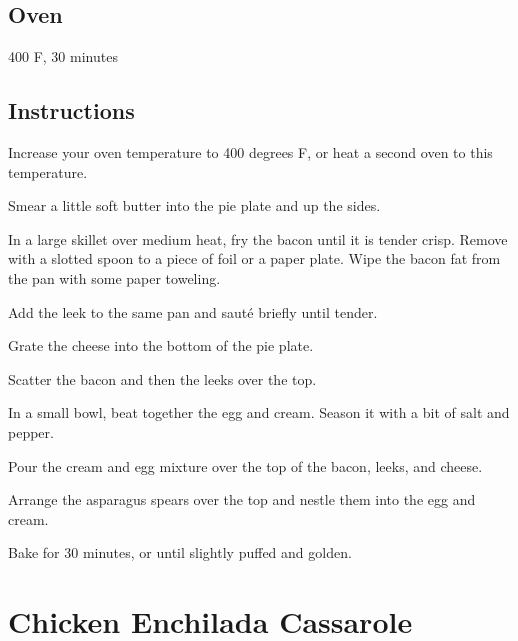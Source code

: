 \documentclass[ansiapaper,10pt,english]{sphinxmanual}
\begin{document}
\section{Oven}
\label{\detokenize{Bacon_Leek_Quiche:oven}}
400 F, 30 minutes


\section{Instructions}
\label{\detokenize{Bacon_Leek_Quiche:instructions}}
Increase your oven temperature to 400 degrees F, or heat a second oven to this temperature.

Smear a little soft butter into the pie plate and up the sides.

In a large skillet over medium heat, fry the bacon until it is tender crisp. Remove with a slotted spoon to a piece of foil or a paper plate. Wipe the bacon fat from the pan with some paper toweling.

Add the leek to the same pan and sauté briefly until tender.

Grate the cheese into the bottom of the pie plate.

Scatter the bacon and then the leeks over the top.

In a small bowl, beat together the egg and cream. Season it with a bit of salt and pepper.

Pour the cream and egg mixture over the top of the bacon, leeks, and cheese.

Arrange the asparagus spears over the top and nestle them into the egg and cream.

Bake for 30 minutes, or until slightly puffed and golden.


\chapter{Chicken Enchilada Cassarole}
\label{\detokenize{Chicken_EC:chicken-enchilada-cassarole}}\label{\detokenize{Chicken_EC::doc}}
\end{document}
